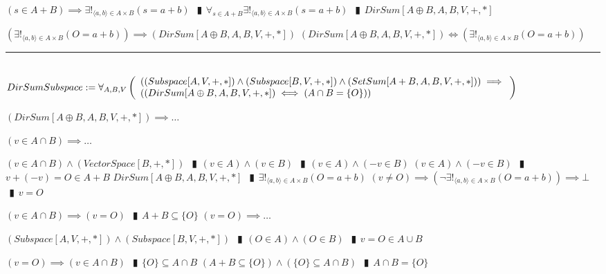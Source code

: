 \documentclass{book}
\newcommand{\abr}{:=}
\newcommand{\pipe}{$\phantom{(}\vrectangleblack\phantom{)}$}
\newcommand{\pr}[1]{\left(#1\right)}
\begin{document}
\begin{shaded}
\begin{enumerate}
\begin{enumerate}
\begin{enumerate}
      \end{enumerate}
      \lit $(s \in A + B) \implies \exists!_{\langle a, b \rangle \in A \times B}(s = a + b)$ \pipe $\forall_{s \in A + B} \exists!_{\langle a, b \rangle \in A \times B}(s = a + b)$ \pipe $DirSum[A \oplus B, A, B, V, +, *]$
    \end{enumerate}
    \lit $\pr{\exists!_{\langle a, b \rangle \in A \times B}(O = a + b)} \implies (DirSum[A \oplus B, A, B, V, +, *])$
    \lit $(DirSum[A \oplus B, A, B, V, +, *]) \iff \pr{\exists!_{\langle a, b \rangle \in A \times B}(O = a + b)}$
  \end{enumerate} \vspace{.75mm} \hrule \vspace{.75mm} \ \\ 

  $DirSumSubspace \abr \forall_{A, B, V}\left(\begin{array}{ll}
    \pr{(Subspace[A, V, +, *]) \land (Subspace[B, V, +, *]) \land (SetSum[A + B, A, B, V, +, *])} \hfill \implies \hfill \\
    \pr{(DirSum[A \oplus B, A, B, V, +, *]) \iff (A \cap B = \{O\})}
  \end{array}\right)$
  \begin{enumerate}
    \lit $(DirSum[A \oplus B, A, B, V, +, *]) \implies \ldots$
    \begin{enumerate}
      \lit $(v \in A \cap B) \implies \ldots$
      \begin{enumerate}
        \lit $(v \in A \cap B) \land (VectorSpace[B, +, *])$ \pipe $(v \in A) \land (v \in B)$ \pipe $(v \in A) \land (-v \in B)$
        \lit $(v \in A) \land (-v \in B)$ \pipe $v + (-v) = O \in A + B$
        \lit $DirSum[A \oplus B, A, B, V, +, *]$ \pipe $\exists!_{\langle a, b \rangle \in A \times B}(O = a + b)$
        \lit $(v \neq O) \implies \pr{\lnot \exists!_{\langle a, b \rangle \in A \times B}(O = a + b)} \implies \bot$ \pipe $v = O$
      \end{enumerate}
      \lit $(v \in A \cap B) \implies (v = O)$ \pipe $A + B \subseteq \{O\}$
      \lit $(v = O) \implies \ldots$
      \begin{enumerate}
        \lit $(Subspace[A, V, +, *]) \land (Subspace[B, V, +, *])$ \pipe $(O \in A) \land (O \in B)$ \pipe $v = O \in A \cup B$
      \end{enumerate}
      \lit $(v = O) \implies (v \in A \cap B)$ \pipe $\{O\} \subseteq A \cap B$
      \lit $(A + B \subseteq \{O\}) \land (\{O\} \subseteq A \cap B)$ \pipe $A \cap B = \{O\}$
    \end{enumerate}

\end{enumerate}
\end{shaded}
\end{document}
